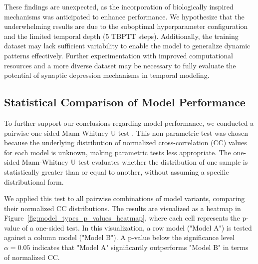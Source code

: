 These findings are unexpected, as the incorporation of biologically inspired mechanisms was anticipated to enhance performance. We hypothesize that the underwhelming results are due to the suboptimal hyperparameter configuration and the limited temporal depth (5 TBPTT steps). Additionally, the training dataset may lack sufficient variability to enable the model to generalize dynamic patterns effectively. Further experimentation with improved computational resources and a more diverse dataset may be necessary to fully evaluate the potential of synaptic depression mechanisms in temporal modeling.

\subsection{Statistical Comparison of Model Performance}
\label{subsec:model_performance_statistical_comparison}

To further support our conclusions regarding model performance, we conducted a pairwise one-sided Mann-Whitney U test \citep{mann_whithey_1947}. This non-parametric test was chosen because the underlying distribution of normalized cross-correlation (CC) values for each model is unknown, making parametric tests less appropriate. The one-sided Mann-Whitney U test evaluates whether the distribution of one sample is statistically greater than or equal to another, without assuming a specific distributional form.

We applied this test to all pairwise combinations of model variants, comparing their normalized CC distributions. The results are visualized as a heatmap in Figure~\ref{fig:model_types_p_values_heatmap}, where each cell represents the p-value of a one-sided test. In this visualization, a row model ("Model A") is tested against a column model ("Model B"). A p-value below the significance level $\alpha = 0.05$ indicates that "Model A" significantly outperforms "Model B" in terms of normalized CC.

